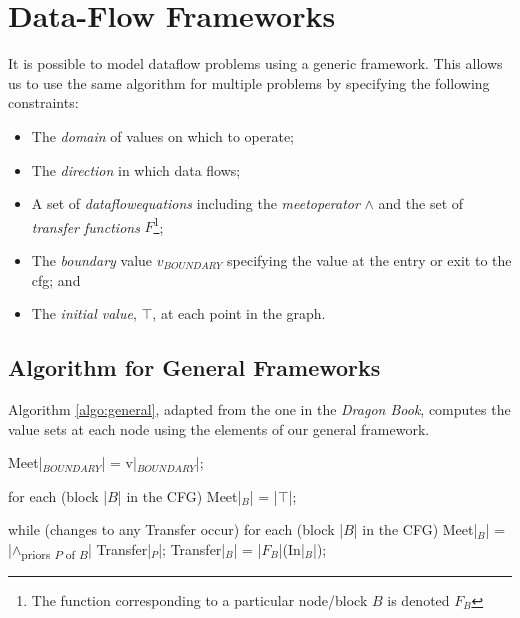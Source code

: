 \documentclass[bsc,twoside,singlespacing,parskip,logo,notimes,normalheadings]{infthesis}
\begin{document}
    \section{Data-Flow Frameworks}\label{sec:background-frameworks}

    It is possible to model \gls{dataflow} problems using a generic
    framework. This allows us to use the same algorithm for multiple
    problems by specifying the following constraints\cite[p. 680]{dragonbook}:

    \begin{itemize}
    \item The {\em \gls{domain}} of values on which to operate;
    \item The {\em \gls{direction}} in which data flows;
    \item A set of {\em \gls{dataflowequations}} including the {\em
        \gls{meetoperator}} $\land$ and the set of {\em
        \gls{transfer} functions} $F$\footnote{The function
        corresponding to a particular node/block $B$ is denoted $F_{B}$};
    \item The {\em \gls{boundary}} value $v_{BOUNDARY}$ specifying
      the value at the entry or exit to the \gls{cfg}; and
    \item The {\em initial value}, $\top$, at each point in the graph.
    \end{itemize}
    
        \subsection{Algorithm for General Frameworks}

        Algorithm \ref{algo:general}, adapted from the one in the {\em
          Dragon Book}\cite[p. 691]{dragonbook}, computes the value
        sets at each node using the elements of our general
        framework.

        \begin{algorithm}[caption={Data-Flow Analysis of General Frameworks}, label={algo:general},escapeinside={||},mathescape=true]
Meet|$_{BOUNDARY}$| = v|$_{BOUNDARY}$|;

for each (block |$B$| in the CFG)
    Meet|$_{B}$| = |$\top$|;

while (changes to any Transfer occur)
    for each (block |$B$| in the CFG)
        Meet|$_{B}$|     = |$\land$\textsubscript{priors $P$ of $B$}| Transfer|$_{P}$|;
        Transfer|$_{B}$| = |$F_{B}$|(In|$_{B}$|);
       \end{algorithm}
\end{document}
